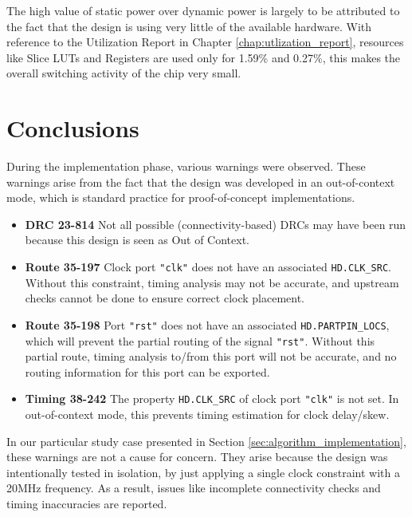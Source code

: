 The high value of static power over dynamic power is largely to be attributed to the fact that the design is using very little of the available hardware. With reference to the Utilization Report in Chapter \ref{chap:utlization_report}, resources like Slice LUTs and Registers are used only for 1.59\% and 0.27\%, this makes the overall switching activity of the chip very small.

\section{Conclusions}
During the implementation phase, various warnings were observed. These warnings arise from the fact that the design was developed in an out-of-context mode, which is standard practice for proof-of-concept implementations.

\begin{tcolorbox}[colback=yellow!20, colframe=yellow!50!black, title=Warnings]
\begin{itemize}
    \item \textbf{DRC 23-814} Not all possible (connectivity-based) DRCs may have been run because this design is seen as Out of Context.
    \item \textbf{Route 35-197} Clock port \texttt{"clk"} does not have an associated \texttt{HD.CLK\_SRC}. Without this constraint, timing analysis may not be accurate, and upstream checks cannot be done to ensure correct clock placement.
    \item \textbf{Route 35-198} Port \texttt{"rst"} does not have an associated \texttt{HD.PARTPIN\_LOCS}, which will prevent the partial routing of the signal \texttt{"rst"}. Without this partial route, timing analysis to/from this port will not be accurate, and no routing information for this port can be exported.
    \item \textbf{Timing 38-242} The property \texttt{HD.CLK\_SRC} of clock port \texttt{"clk"} is not set. In out-of-context mode, this prevents timing estimation for clock delay/skew.
\end{itemize}
\end{tcolorbox}

In our particular study case presented in Section \ref{sec:algorithm_implementation}, these warnings are not a cause for concern. They arise because the design was intentionally tested in isolation, by just applying a single clock constraint with a 20MHz frequency. As a result, issues like incomplete connectivity checks and timing inaccuracies are reported.

